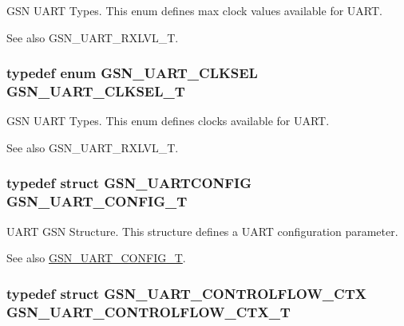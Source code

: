 GSN UART Types. This enum defines max clock values available for UART. 

\begin{DoxySeeAlso}{See also}
GSN\_\-UART\_\-RXLVL\_\-T. 
\end{DoxySeeAlso}
\hypertarget{a00656_ga615bd92bf0cbe48e5b0502e97a57b0a5}{
\subsubsection[{GSN\_\-UART\_\-CLKSEL\_\-T}]{\setlength{\rightskip}{0pt plus 5cm}typedef enum {\bf GSN\_\-UART\_\-CLKSEL} {\bf GSN\_\-UART\_\-CLKSEL\_\-T}}}
\label{a00656_ga615bd92bf0cbe48e5b0502e97a57b0a5}


GSN UART Types. This enum defines clocks available for UART. 

\begin{DoxySeeAlso}{See also}
GSN\_\-UART\_\-RXLVL\_\-T. 
\end{DoxySeeAlso}
\hypertarget{a00656_gab793201a4cc37e8cf27b0b640b1f37bc}{
\subsubsection[{GSN\_\-UART\_\-CONFIG\_\-T}]{\setlength{\rightskip}{0pt plus 5cm}typedef struct {\bf GSN\_\-UARTCONFIG}  {\bf GSN\_\-UART\_\-CONFIG\_\-T}}}
\label{a00656_gab793201a4cc37e8cf27b0b640b1f37bc}


UART GSN Structure. This structure defines a UART configuration parameter. 

\begin{DoxySeeAlso}{See also}
\hyperlink{a00656_gab793201a4cc37e8cf27b0b640b1f37bc}{GSN\_\-UART\_\-CONFIG\_\-T}. 
\end{DoxySeeAlso}
\hypertarget{a00656_ga3db249a0ebcad29608945db9a3628070}{
\subsubsection[{GSN\_\-UART\_\-CONTROLFLOW\_\-CTX\_\-T}]{\setlength{\rightskip}{0pt plus 5cm}typedef struct {\bf GSN\_\-UART\_\-CONTROLFLOW\_\-CTX}  {\bf GSN\_\-UART\_\-CONTROLFLOW\_\-CTX\_\-T}}}
\label{a00656_ga3db249a0ebcad29608945db9a3628070}



